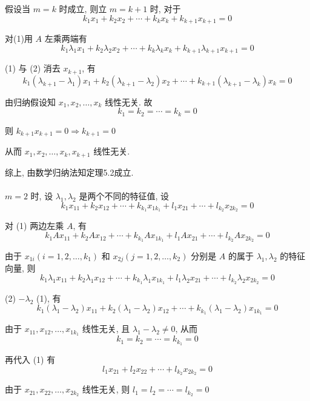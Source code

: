 		 假设当 \( m=k \) 时成立, 则立 \( m=k+1 \) 时, 对于
		 \[ k_{1}x_{1} + k_{2}x_{2} + \cdots + k_{k}x_{k} + k_{k+1}x_{k+1} = 0 \tag{1} \]

		 对(1)用 \( A \) 左乘两端有
		 \[ k_{1}\lambda_{1}x_{1} + k_{2}\lambda_{2}x_{2} + \cdots + k_{k}\lambda_{k}x_{k} + k_{k+1}\lambda_{k+1}x_{k+1} = 0 \tag{2} \]

		 (1) 与 (2) 消去 \( x_{k+1} \), 有
		 \[ k_{1}(\lambda_{k+1} - \lambda_{1})x_{1} + k_{2}(\lambda_{k+1} - \lambda_{2})x_{2} + \cdots + k_{k+1}(\lambda_{k+1} - \lambda_{k})x_{k} = 0 \]

		 由归纳假设知 \( x_{1}, x_{2}, \dots, x_{k} \) 线性无关. 故
		 \[ k_{1} = k_{2} = \cdots = k_{k} = 0 \]

		 则 \( k_{k+1}x_{k+1} = 0 \Rightarrow k_{k+1} = 0 \)

		 从而 \( x_{1}, x_{2}, \dots, x_{k}, x_{k+1} \) 线性无关.

		 综上, 由数学归纳法知定理5.2成立.


	 \paragraph{} %
		 \( m=2 \) 时, 设 \( \lambda_{1}, \lambda_{2} \) 是两个不同的特征值, 设
		 \[ k_{1}x_{11} + k_{2}x_{12} + \cdots + k_{k_{1}}x_{1k_{1}} + l_{1}x_{21} + \cdots + l_{k_{2}}x_{2k_{2}} = 0 \tag{1} \]

		 对 (1) 两边左乘 \( A \), 有
		 \[ k_{1}A x_{11} + k_{2}A x_{12} + \cdots + k_{k_{1}}A x_{1k_{1}} + l_{1}A x_{21} + \cdots + l_{k_{2}}A x_{2k_{2}} = 0 \]

		 由于 \( x_{1i} (i=1,2,\dots,k_{1}) \) 和 \( x_{2j} (j=1,2,\dots,k_{2}) \) 分别是 \( A \) 的属于 \( \lambda_{1}, \lambda_{2} \) 的特征向量, 则
		 \[ k_{1}\lambda_{1}x_{11} + k_{2}\lambda_{1}x_{12} + \cdots + k_{k_{1}}\lambda_{1}x_{1k_{1}} + l_{1}\lambda_{2}x_{21} + \cdots + l_{k_{2}}\lambda_{2}x_{2k_{2}} = 0 \tag{2} \]

		 (2) \( - \lambda_{2} \) (1), 有
		 \[ k_{1}(\lambda_{1} - \lambda_{2})x_{11} + k_{2}(\lambda_{1} - \lambda_{2})x_{12} + \cdots + k_{k_{1}}(\lambda_{1} - \lambda_{2})x_{1k_{1}} = 0 \]

		 由于 \( x_{11}, x_{12}, \dots, x_{1k_{1}} \) 线性无关, 且 \( \lambda_{1} - \lambda_{2} \neq 0 \), 从而
		 \[ k_{1} = k_{2} = \cdots = k_{k_{1}} = 0 \]

		 再代入 (1) 有
		 \[ l_{1}x_{21} + l_{2}x_{22} + \cdots + l_{k_{2}}x_{2k_{2}} = 0 \]

		 由于 \( x_{21}, x_{22}, \dots, x_{2k_{2}} \) 线性无关, 则 \( l_{1} = l_{2} = \cdots = l_{k_{2}} = 0 \)

